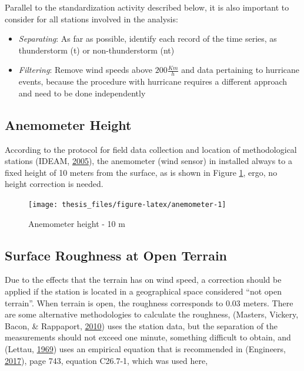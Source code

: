 \documentclass[12pt,oneside]{reedthesis}
\begin{document}
Parallel to the standardization activity described below, it is also important to consider for all stations involved in the analysis:
\begin{itemize}
\item
  \emph{Separating}: As far as possible, identify each record of the time series, as thunderstorm (t) or non-thunderstorm (nt)
\item
  \emph{Filtering}: Remove wind speeds above \(200 \frac{Km}{h}\) and data pertaining to hurricane events, because the procedure with hurricane requires a different approach and need to be done independently
\end{itemize}
\hypertarget{anemometer-height}{%
\subsection{Anemometer Height}\label{anemometer-height}}

According to the protocol for field data collection and location of methodological stations (IDEAM, \protect\hyperlink{ref-ideam2005}{2005}), the anemometer (wind sensor) in installed always to a fixed height of 10 meters from the surface, as is shown in Figure \ref{fig:anemometer}, ergo, no height correction is needed.
\begin{figure}

{\centering \texttt{[image: thesis\_files/figure-latex/anemometer-1]} 

}

\caption{Anemometer height - 10 m}\label{fig:anemometer}
\end{figure}
\hypertarget{rmd-roughness}{%
\subsection{Surface Roughness at Open Terrain}\label{rmd-roughness}}

Due to the effects that the terrain has on wind speed, a correction should be applied if the station is located in a geographical space considered ``not open terrain''. When terrain is open, the roughness corresponds to 0.03 meters. There are some alternative methodologies to calculate the roughness, (Masters, Vickery, Bacon, \& Rappaport, \protect\hyperlink{ref-Masters2010}{2010}) uses the station data, but the separation of the measurements should not exceed one minute, something difficult to obtain, and (Lettau, \protect\hyperlink{ref-Lettau1969}{1969}) uses an empirical equation that is recommended in (Engineers, \protect\hyperlink{ref-Asce2017}{2017}), page 743, equation C26.7-1, which was used here,
\end{document}
